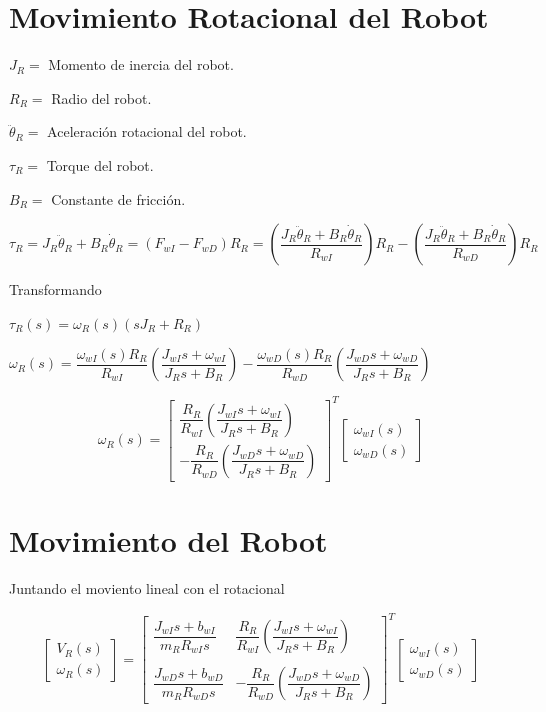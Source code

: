 \section{Movimiento Rotacional del Robot}

$J_{R} = $ Momento de inercia del robot.

$R_{R} = $ Radio del robot.

$\ddot{\theta}_{R} = $ Aceleración rotacional del robot.

$\tau_{R} = $ Torque del robot.

$B_{R} = $ Constante de fricción.

$\tau_{R} = J_{R}\ddot{\theta}_{R} + B_{R}\dot{\theta}_{R} = (F_{wI} - F_{wD}) R_{R} = \left( \dfrac{J_{R}\ddot{\theta}_{R} + B_{R}\dot{\theta}_{R}}{R_{wI}} \right) R_{R} - \left( \dfrac{J_{R}\ddot{\theta}_{R} + B_{R}\dot{\theta}_{R}}{R_{wD}} \right)R_{R}$

Transformando

$\tau_{R}(s) = \omega_{R}(s)(sJ_{R} + R_{R})$

$\omega_{R}(s) = \dfrac{\omega_{wI}(s)R_{R}}{R_{wI}} \left( \dfrac{J_{wI}s + \omega_{wI}}{J_{R}s + B_{R}} \right) - \dfrac{\omega_{wD}(s)R_{R}}{R_{wD}} \left( \dfrac{J_{wD}s + \omega_{wD}}{J_{R}s + B_{R}} \right)$

\[
\omega_{R}(s) = 
\begin{bmatrix}
\dfrac{R_{R}}{R_{wI}}  \left( \dfrac{J_{wI}s + \omega_{wI}}{J_{R}s + B_{R}} \right) \\
-\dfrac{R_{R}}{R_{wD}} \left( \dfrac{J_{wD}s + \omega_{wD}}{J_{R}s + B_{R}} \right) 
\end{bmatrix}^{T} \begin{bmatrix}
\omega_{wI}(s) \\
\omega_{wD}(s)
\end{bmatrix}
\]


\section{Movimiento del Robot}

Juntando el moviento lineal con el rotacional


\[
\begin{bmatrix}
V_{R}(s) \\
\omega_{R}(s)
\end{bmatrix} = \begin{bmatrix}
\dfrac{J_{wI}s + b_{wI}}{m_{R}R_{wI}s} & \dfrac{R_{R}}{R_{wI}} \left( \dfrac{J_{wI}s + \omega_{wI}}{J_{R}s + B_{R}} \right) \\
                                       &    \\
\dfrac{J_{wD}s + b_{wD}}{m_{R}R_{wD}s} & -\dfrac{R_{R}}{R_{wD}} \left( \dfrac{J_{wD}s + \omega_{wD}}{J_{R}s + B_{R}} \right)
\end{bmatrix}^{T} \begin{bmatrix}
\omega_{wI}(s) \\
\omega_{wD}(s)
\end{bmatrix}
\]

